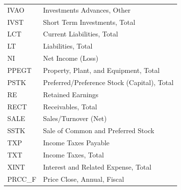 \documentclass[conference]{IEEEtran}
\begin{document}
\begin{table}[htbp]
\begin{tabular}{@{}p{3.4cm}p{5cm}@{}}
\hspace{5mm}IVAO & Investments Advances, Other\hspace{5mm} \\
\hspace{5mm}IVST & Short Term Investments, Total\hspace{5mm} \\
\hspace{5mm}LCT & Current Liabilities, Total\hspace{5mm} \\
\hspace{5mm}LT & Liabilities, Total\hspace{5mm} \\
\hspace{5mm}NI & Net Income (Loss)\hspace{5mm} \\
\hspace{5mm}PPEGT & Property, Plant, and Equipment, Total\hspace{5mm} \\
\hspace{5mm}PSTK & Preferred/Preference Stock (Capital), Total \\
\hspace{5mm}RE & Retained Earnings\hspace{5mm} \\
\hspace{5mm}RECT & Receivables, Total\hspace{5mm} \\
\hspace{5mm}SALE & Sales/Turnover (Net)\hspace{5mm} \\
\hspace{5mm}SSTK & Sale of Common and Preferred Stock\hspace{5mm} \\
\hspace{5mm}TXP & Income Taxes Payable\hspace{5mm} \\
\hspace{5mm}TXT & Income Taxes, Total\hspace{5mm} \\
\hspace{5mm}XINT & Interest and Related Expense, Total\hspace{5mm} \\
\hspace{5mm}PRCC\_F & Price Close, Annual, Fiscal\hspace{5mm} \\
\bottomrule
\end{tabular}
\label{tab1}
\end{table}
\end{document}
